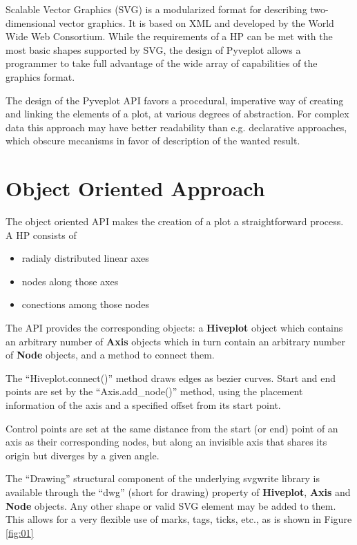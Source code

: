 \documentclass{bioinfo}
\begin{document}
Scalable Vector Graphics (SVG) is a modularized format for describing
two-dimensional vector graphics. It is based on XML and developed by
the World Wide Web Consortium. \cite{McCormack:11:SVG} While the
requirements of a HP can be met with the most basic shapes supported
by SVG, the design of Pyveplot allows a programmer to take full
advantage of the wide array of capabilities of the graphics format.

The design of the Pyveplot API favors a procedural, imperative way of
creating and linking the elements of a plot, at various degrees of
abstraction. For complex data this approach may have better
readability than e.g. declarative approaches, which obscure mecanisms in
favor of description of the wanted result.

\section{Object Oriented Approach}

The object oriented API makes the creation of a plot a straightforward
process. A HP consists of
\begin{itemize}
\item radialy distributed linear axes
\item nodes along those axes
\item conections among those nodes
\end{itemize}
The API provides the corresponding objects: a {\bfseries Hiveplot} object
which contains an arbitrary number of {\bfseries Axis} objects which in
turn contain an arbitrary number of {\bfseries Node} objects, and a method
to connect them.

The ``Hiveplot.connect()'' method draws edges as bezier curves. Start and
end points are set by the ``Axis.add\_node()'' method, using the placement
information of the axis and a specified offset from its start point.

Control points are set at the same distance from the start (or end)
point of an axis as their corresponding nodes, but along an invisible
axis that shares its origin but diverges by a given angle.

The ``Drawing'' structural component of the underlying svgwrite
library is available through the ``dwg'' (short for drawing) property
of {\bfseries Hiveplot}, {\bfseries Axis} and {\bfseries Node}
objects. Any other shape or valid SVG element may be added to them.
This allows for a very flexible use of marks, tags, ticks, etc., as is
shown in Figure \ref{fig:01}
\end{document}
